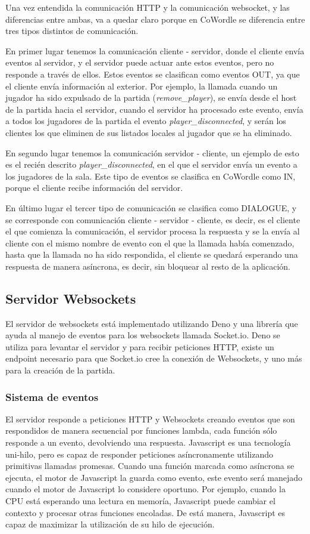 Una vez entendida la comunicación HTTP y la comunicación websocket, y las diferencias entre ambas, va a quedar claro porque en CoWordle se diferencia entre tres tipos distintos de comunicación.

En primer lugar tenemos la comunicación cliente - servidor, donde el cliente envía eventos al servidor, y el servidor puede actuar ante estos eventos, pero no responde a través de ellos. 
Estos eventos se clasifican como eventos OUT, ya que el cliente envía información al exterior. Por ejemplo, la llamada cuando un jugador ha sido expulsado de la partida (\textit{remove\_player}), se envía desde el host de la partida hacia el servidor, cuando el servidor ha procesado este evento, envía a todos los jugadores de la partida el evento \textit{player\_disconnected}, y serán los clientes los que eliminen de sus listados locales al jugador que se ha eliminado.

En segundo lugar tenemos la comunicación servidor - cliente, un ejemplo de esto es el recién descrito \textit{player\_disconnected}, en el que el servidor envía un evento a los jugadores de la sala. Este tipo de eventos se clasifica en CoWordle como IN, porque el cliente recibe información del servidor.

En último lugar el tercer tipo de comunicación se clasifica como DIALOGUE, y se corresponde con comunicación cliente - servidor - cliente, es decir, es el cliente el que comienza la comunicación, el servidor procesa la respuesta y se la envía al cliente con el mismo nombre de evento con el que la llamada había comenzado, hasta que la llamada no ha sido respondida, el cliente se quedará esperando una respuesta de manera asíncrona, es decir, sin bloquear al resto de la aplicación.

\subsection{Servidor Websockets}
El servidor de websockets está implementado utilizando Deno y una librería que ayuda al manejo de eventos para los websockets llamada Socket.io. Deno se utiliza para levantar el servidor y para recibir peticiones HTTP, existe un endpoint necesario para que Socket.io cree la conexión de Websockets, y uno más para la creación de la partida. 

\subsubsection{Sistema de eventos}
El servidor responde a peticiones HTTP y Websockets creando eventos que son respondidos de manera secuencial por funciones lambda, cada función sólo responde a un evento, devolviendo una respuesta.
Javascript es una tecnología uni-hilo, pero es capaz de responder peticiones asíncronamente utilizando primitivas llamadas promesas. Cuando una función marcada como asíncrona se ejecuta, el motor de Javascript la guarda como evento, este evento será manejado cuando el motor de Javascript lo considere oportuno. Por ejemplo, cuando la CPU está esperando una lectura en memoría, Javascript puede cambiar el contexto y procesar otras funciones encoladas. De está manera, Javascript es capaz de maximizar la utilización de su hilo de ejecución.

